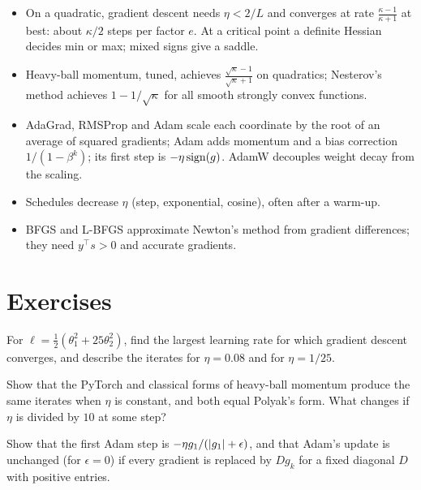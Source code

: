 \begin{notechapter}
\begin{chaptersummary}
\begin{itemize}[nosep]
  \item On a quadratic, gradient descent needs $\eta<2/L$ and converges at rate $\frac{\kappa - 1}{\kappa + 1}$ at best: about $\kappa/2$
        steps per factor $e$. At a critical point a definite Hessian decides min or max; mixed
        signs give a saddle.
  \item Heavy-ball momentum, tuned, achieves $\frac{\sqrt\kappa - 1}{\sqrt\kappa + 1}$ on quadratics; Nesterov's method achieves
        $1 - 1/\sqrt\kappa$ for all smooth strongly convex functions.
  \item AdaGrad, RMSProp and Adam scale each coordinate by the root of an average of squared
        gradients; Adam adds momentum and a bias correction $1/(1 - \beta^k)$; its first step is $-\eta\operatorname{sign}(g)$.
        AdamW decouples weight decay from the scaling.
  \item Schedules decrease $\eta$ (step, exponential, cosine), often after a warm-up.
  \item BFGS and L-BFGS approximate Newton's method from gradient differences; they need
        $y^\top s>0$ and accurate gradients.
\end{itemize}
\end{chaptersummary}

\section*{Exercises}

\begin{exercise}\label{optimizers:exr:1}
For $\ell = \frac12(\theta_1^2 + 25\theta_2^2)$, find the largest learning rate for which gradient descent converges, and
describe the iterates for $\eta = 0.08$ and for $\eta = 1/25$.
\end{exercise}

\begin{exercise}\label{optimizers:exr:2}
Show that the PyTorch and classical forms of heavy-ball momentum produce the same iterates
when $\eta$ is constant, and both equal Polyak's form. What changes if $\eta$ is divided by $10$ at some
step?
\end{exercise}

\begin{exercise}\label{optimizers:exr:3}
Show that the first Adam step is $-\eta g_1/(\left|g_1\right| + \epsilon)$, and that Adam's update is unchanged (for $\epsilon = 0$) if
every gradient is replaced by $Dg_k$ for a fixed diagonal $D$ with positive entries.
\end{exercise}


\end{notechapter}
